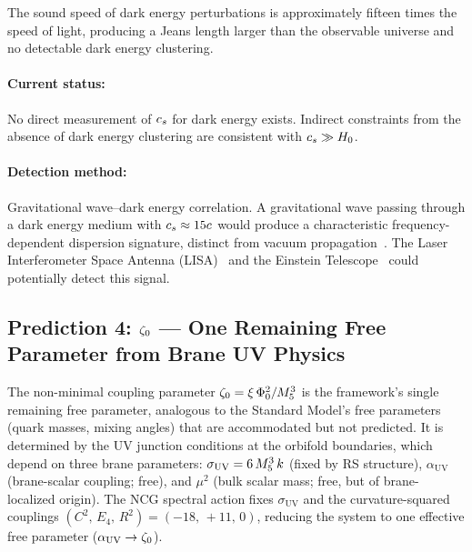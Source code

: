 The sound speed of dark energy perturbations is approximately fifteen times the speed of light, producing a Jeans length larger than the observable universe and no detectable dark energy clustering.

\paragraph{Current status:} No direct measurement of $c_s$ for dark energy exists. Indirect constraints from the absence of dark energy clustering are consistent with $c_s \gg H_0$.

\paragraph{Detection method:} Gravitational wave--dark energy correlation. A gravitational wave passing through a dark energy medium with $c_s \approx 15c$ would produce a characteristic frequency-dependent dispersion signature, distinct from vacuum propagation~\cite{ch1:amendola18}. The Laser Interferometer Space Antenna (LISA)~\cite{ch1:lisa} and the Einstein Telescope~\cite{ch1:einstein-telescope} could potentially detect this signal.

\subsection{Prediction 4: \texorpdfstring{$\zeta_0$}{zeta0} --- One Remaining Free Parameter from Brane UV Physics}
\label{sec:1-pred4}

The non-minimal coupling parameter $\zeta_0 = \xi\,\Phi_0^2/M_5^3$ is the framework's single remaining free parameter, analogous to the Standard Model's free parameters (quark masses, mixing angles) that are accommodated but not predicted. It is determined by the UV junction conditions at the orbifold boundaries, which depend on three brane parameters: $\sigma_\mathrm{UV} = 6\,M_5^3\,k$ (fixed by RS structure), $\alpha_\mathrm{UV}$ (brane-scalar coupling; free), and $\mu^2$ (bulk scalar mass; free, but of brane-localized origin). The NCG spectral action fixes $\sigma_\mathrm{UV}$ and the curvature-squared couplings $(C^2,\,E_4,\,R^2) = (-18,\,+11,\,0)$, reducing the system to one effective free parameter ($\alpha_\mathrm{UV} \to \zeta_0$).

